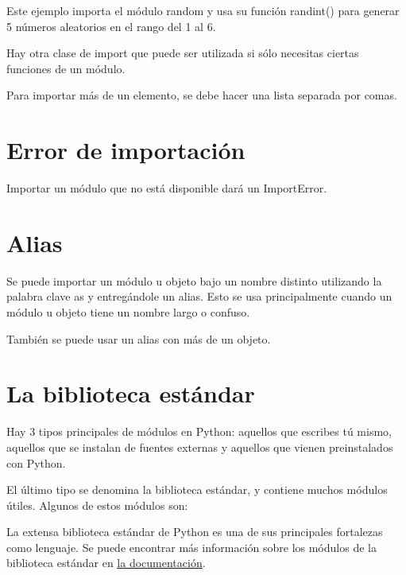 \documentclass{report}
\newcommand{\link}[2]{\href{#1}{\underline{#2}}}
\begin{document}

Este ejemplo importa el módulo random y usa su función randint() para generar 5 números aleatorios en el rango del 1 al 6.\smallskip

Hay otra clase de import que puede ser utilizada si sólo necesitas ciertas funciones de un módulo.


Para importar más de un elemento, se debe hacer una lista separada por comas.


\section{Error de importación}

Importar un módulo que no está disponible dará un ImportError.


\section{Alias}

Se puede importar un módulo u objeto bajo un nombre distinto utilizando la palabra clave as y entregándole un alias. Esto se usa principalmente cuando un módulo u objeto tiene un nombre largo o confuso.


También se puede usar un alias con más de un objeto.


\section{La biblioteca estándar}

Hay 3 tipos principales de módulos en Python: aquellos que escribes tú mismo, aquellos que se instalan de fuentes externas y aquellos que vienen preinstalados con Python.\smallskip

El último tipo se denomina la biblioteca estándar, y contiene muchos módulos útiles. Algunos de estos módulos son:


La extensa biblioteca estándar de Python es una de sus principales fortalezas como lenguaje. Se puede encontrar más información sobre los módulos de la biblioteca estándar en \link{https://docs.python.org/3/library/index.html}{la documentación}.\smallskip
\end{document}
